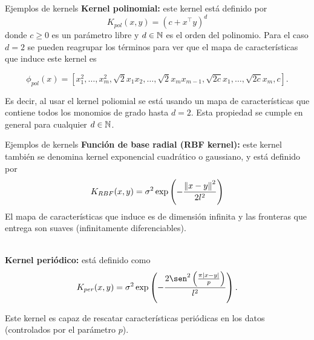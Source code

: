 \documentclass[9pt]{beamer}
\begin{document}
\begin{frame}{Ejemplos de kernels}
\textbf{Kernel polinomial:} este kernel está definido por
\begin{equation*}
       K_{pol} (x, y) = (c + x^\top y)^d
\end{equation*}
donde $c\geq 0$ es un parámetro libre y $d\in{\mathbb N}$ es el orden del polinomio. \pause Para el caso $d=2$ se pueden reagrupar los términos para ver que el mapa de características que induce este kernel es
    
\begin{equation*}
        \phi_{pol}(x) = [x_1^2,\ldots,x_m^2,\sqrt{2}x_1x_2,\ldots, \sqrt{2}x_{m}x_{m-1},\sqrt{2c}x_1,\ldots,\sqrt{2c}x_m,c].
\end{equation*}\pause

Es decir, al usar el kernel poliomial se está usando un mapa de características que contiene todos los monomios de grado hasta $d=2$. Esta propiedad se cumple en general para cualquier $d\in{\mathbb N}$.

\end{frame}

\begin{frame}{Ejemplos de kernels}
\textbf{Función de base radial (RBF kernel):} este kernel también se denomina kernel exponencial cuadrático o gaussiano, y está definido por
    \begin{equation*}
        K_{RBF} (x , y ) = \sigma^2 \exp\left(-\frac{\left\lVert x -y\right\rVert^2}{2l^2}\right)
    \end{equation*}
El mapa de características que induce es de dimensión infinita y las fronteras que entrega son suaves (infinitamente diferenciables).\\~\ \pause

\textbf{Kernel periódico:} está definido como
    \begin{equation*}
       K_{per} (x , y) = \sigma^2 \exp\left(- \frac{2\sen^2 \left(\frac{\pi|x -y|}{p}\right)}{l^2}\right).
    \end{equation*}
    
    Este kernel es capaz de rescatar características periódicas en los datos (controlados por el parámetro $p$). 
\end{frame}
\end{document}
